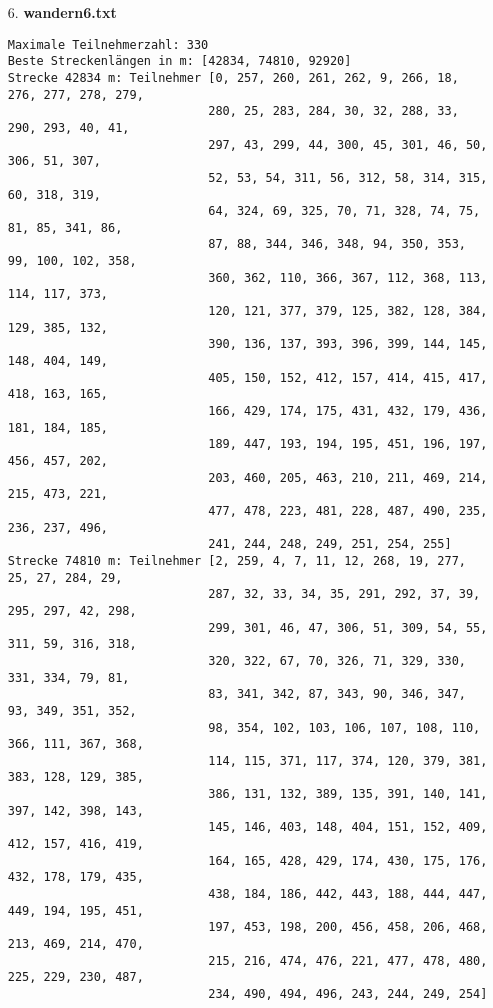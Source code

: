 \documentclass[a4paper,10pt,ngerman]{scrartcl}
\begin{document}
\begin{itemize}
  \item [6.] \textbf{wandern6.txt}
  \begin{verbatim}
Maximale Teilnehmerzahl: 330
Beste Streckenlängen in m: [42834, 74810, 92920]
Strecke 42834 m: Teilnehmer [0, 257, 260, 261, 262, 9, 266, 18, 276, 277, 278, 279, 
                            280, 25, 283, 284, 30, 32, 288, 33, 290, 293, 40, 41, 
                            297, 43, 299, 44, 300, 45, 301, 46, 50, 306, 51, 307, 
                            52, 53, 54, 311, 56, 312, 58, 314, 315, 60, 318, 319, 
                            64, 324, 69, 325, 70, 71, 328, 74, 75, 81, 85, 341, 86, 
                            87, 88, 344, 346, 348, 94, 350, 353, 99, 100, 102, 358, 
                            360, 362, 110, 366, 367, 112, 368, 113, 114, 117, 373, 
                            120, 121, 377, 379, 125, 382, 128, 384, 129, 385, 132, 
                            390, 136, 137, 393, 396, 399, 144, 145, 148, 404, 149, 
                            405, 150, 152, 412, 157, 414, 415, 417, 418, 163, 165, 
                            166, 429, 174, 175, 431, 432, 179, 436, 181, 184, 185, 
                            189, 447, 193, 194, 195, 451, 196, 197, 456, 457, 202, 
                            203, 460, 205, 463, 210, 211, 469, 214, 215, 473, 221, 
                            477, 478, 223, 481, 228, 487, 490, 235, 236, 237, 496, 
                            241, 244, 248, 249, 251, 254, 255]
Strecke 74810 m: Teilnehmer [2, 259, 4, 7, 11, 12, 268, 19, 277, 25, 27, 284, 29, 
                            287, 32, 33, 34, 35, 291, 292, 37, 39, 295, 297, 42, 298, 
                            299, 301, 46, 47, 306, 51, 309, 54, 55, 311, 59, 316, 318, 
                            320, 322, 67, 70, 326, 71, 329, 330, 331, 334, 79, 81, 
                            83, 341, 342, 87, 343, 90, 346, 347, 93, 349, 351, 352, 
                            98, 354, 102, 103, 106, 107, 108, 110, 366, 111, 367, 368, 
                            114, 115, 371, 117, 374, 120, 379, 381, 383, 128, 129, 385, 
                            386, 131, 132, 389, 135, 391, 140, 141, 397, 142, 398, 143, 
                            145, 146, 403, 148, 404, 151, 152, 409, 412, 157, 416, 419, 
                            164, 165, 428, 429, 174, 430, 175, 176, 432, 178, 179, 435, 
                            438, 184, 186, 442, 443, 188, 444, 447, 449, 194, 195, 451, 
                            197, 453, 198, 200, 456, 458, 206, 468, 213, 469, 214, 470, 
                            215, 216, 474, 476, 221, 477, 478, 480, 225, 229, 230, 487, 
                            234, 490, 494, 496, 243, 244, 249, 254]

\end{verbatim}
\end{itemize}
\end{document}
